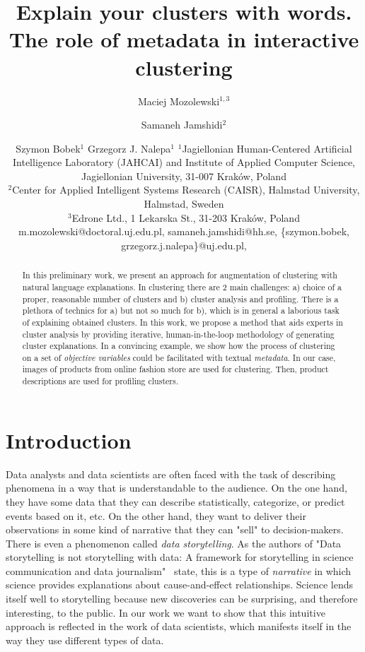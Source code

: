\documentclass{article}
\title{Explain your clusters with words. The role of metadata in interactive clustering}
\author{
Maciej Mozolewski$^{1,3}$
\and
Samaneh Jamshidi$^2$\and
Szymon Bobek$^1$\And
Grzegorz J. Nalepa$^1$
\affiliations
$^1$Jagiellonian Human-Centered Artificial Intelligence Laboratory (JAHCAI) and Institute of Applied Computer Science, Jagiellonian University, 31-007 Kraków, Poland\\
$^2$Center for Applied Intelligent Systems Research (CAISR), Halmstad University, Halmstad, Sweden\\
$^3$Edrone Ltd., 1 Lekarska St., 31-203 Kraków, Poland \\
\emails
m.mozolewski@doctoral.uj.edu.pl,
samaneh.jamshidi@hh.se,
\{szymon.bobek, grzegorz.j.nalepa\}@uj.edu.pl,
}
\begin{document}
\maketitle

\begin{abstract}
    In this preliminary work, we present an approach for augmentation of clustering with natural language explanations.
    In clustering there are 2 main challenges: a) choice of a proper, reasonable number of clusters and b) cluster analysis and profiling.
    There is a plethora of technics for a) but not so much for b), which is in general a laborious task of explaining obtained clusters.
    In this work, we propose a method that aids experts in cluster analysis by providing iterative, human-in-the-loop methodology of generating cluster explanations.
    In a convincing example, we show how the process of clustering on a set of \textit{objective variables} could be facilitated with textual \textit{metadata}.
    In our case, images of products from online fashion store are used for clustering.
    Then, product descriptions are used for profiling clusters.
\end{abstract}

\section{Introduction}\label{sec:introduction}
Data analysts and data scientists are often faced with the task of describing phenomena in a way that is understandable to the audience.
On the one hand, they have some data that they can describe statistically, categorize, or predict events based on it, etc.
On the other hand, they want to deliver their observations in some kind of narrative that they can "sell" to decision-makers.
There is even a phenomenon called \textit{data storytelling}.
As the authors of "Data storytelling is not storytelling with data: A framework for storytelling in science communication and data journalism"~\cite{doi:10.1080/01972243.2021.1951415} state, this is a type of \textit{narrative} in which science provides explanations about cause-and-effect relationships.
Science lends itself well to storytelling because new discoveries can be surprising, and therefore interesting, to the public.
In our work we want to show that this intuitive approach is reflected in the work of data scientists, which manifests itself in the way they use different types of data.
\end{document}
